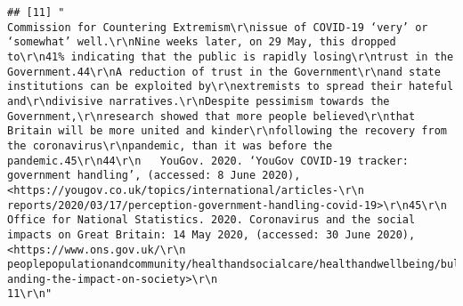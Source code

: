 \documentclass[
]{book}
\begin{document}
\begin{verbatim}
## [11] "                                                    Commission for Countering Extremism\r\nissue of COVID-19 ‘very’ or ‘somewhat’ well.\r\nNine weeks later, on 29 May, this dropped to\r\n41% indicating that the public is rapidly losing\r\ntrust in the Government.44\r\nA reduction of trust in the Government\r\nand state institutions can be exploited by\r\nextremists to spread their hateful and\r\ndivisive narratives.\r\nDespite pessimism towards the Government,\r\nresearch showed that more people believed\r\nthat Britain will be more united and kinder\r\nfollowing the recovery from the coronavirus\r\npandemic, than it was before the pandemic.45\r\n44\r\n   YouGov. 2020. ‘YouGov COVID-19 tracker: government handling’, (accessed: 8 June 2020), <https://yougov.co.uk/topics/international/articles-\r\n   reports/2020/03/17/perception-government-handling-covid-19>\r\n45\r\n   Office for National Statistics. 2020. Coronavirus and the social impacts on Great Britain: 14 May 2020, (accessed: 30 June 2020), <https://www.ons.gov.uk/\r\n   peoplepopulationandcommunity/healthandsocialcare/healthandwellbeing/bulletins/coronavirusandthesocialimpactsongreatbritain/14may2020#underst\r\n   anding-the-impact-on-society>\r\n                                                                              11\r\n"                                                                                                                                                                                                                                                                                                                                                                                                                                                                                                                                                                                                                                                                                                                                                                                                                                                                                                                                                                                                                                                                                                                                                                                                                                                                                                                                                                                                                                                                                                                                                                                                                                                                                                                                                                                                                                                                                                                                                                                                                                                                                  
\end{verbatim}
\end{document}
